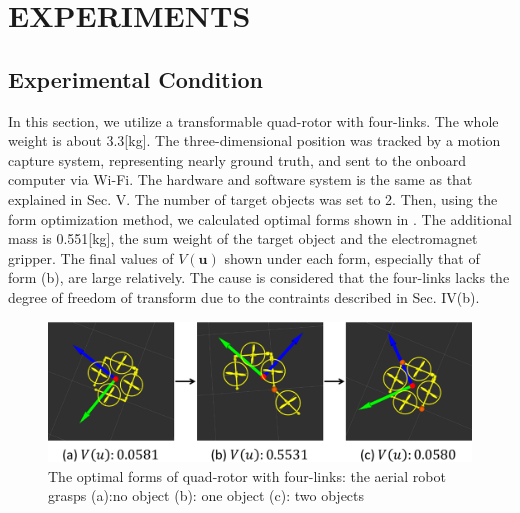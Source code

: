 \section{EXPERIMENTS}
\subsection{Experimental Condition}
In this section, we utilize a transformable quad-rotor with four-links. The whole weight is about 3.3[kg]. The three-dimensional position was tracked by a motion capture system, representing nearly ground truth, and sent to the onboard computer via Wi-Fi. The hardware and software system is the same as that explained in Sec. V. The number of target objects was set to 2. Then, using the form optimization method, we calculated optimal forms shown in . The additional mass is 0.551[kg], the sum weight of the target object and the electromagnet gripper. The final values of $V(\bm{u})$ shown under each form, especially that of form (b), are large relatively. The cause is considered that the four-links lacks the degree of freedom of transform due to the contraints described in Sec. IV(b). 
\begin{figure}[t]
  \begin{center}
    \includegraphics[width=1.0\columnwidth]{figs/quad_state.pdf}
  \end{center}
  \caption{The optimal forms of quad-rotor with four-links: the aerial robot grasps (a):no object (b): one object (c): two objects\label{figure:quad_state}}
\end{figure}

